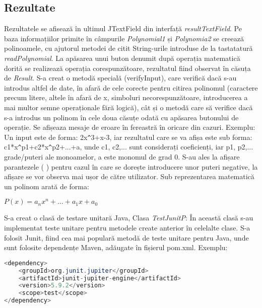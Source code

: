 \documentclass[a4paper,12pt]{article}
\begin{document}
\begin{enumerate}
\section{Rezultate}
Rezultatele se afisează în ultimul JTextField din interfață \emph{resultTextField}. Pe baza informațiilor primite în câmpurile \emph{Polynomial1} și \emph{Polynomia2} se creează polinoamele, cu ajutorul metodei de citit String-urile introduse de la tastatatură \emph{readPolynomial}. La apăsarea unui buton denumit după operația matematică dorită se realizează operația corespunzătoare, rezultatul fiind observat în căsuța de \emph{Result}. S-a creat o metodă specială (verifyInput), care verifică dacă s-au introdus altfel de date, în afară de cele corecte pentru citirea polinomul (caractere precum litere, altele în afară de x, simboluri necorespunzătoare, introducerea a mai multor semne operaționale fără logică), cât și o metodă care să verifice dacă s-a introdus un polinom în cele doua căsuțe odată cu apăsarea butonului de operație. Se afișeaza mesaje de eroare în fereastră în oricare din cazuri. 
Exemplu:
\newline
Un input este de forma:  2x\verb|^|3+x-3, iar rezultatul care se va afișa este sub forma: c1*x\verb|^|p1+c2*x\verb|^|p2+...+a, unde c1, c2,... sunt considerați coeficienți, iar p1, p2,... grade/puteri ale monoamelor, a este monomul de grad 0. S-au ales la afișare parantezele ( ) pentru cazul în care se dorește introducere unor puteri negative, la afișare se vor observa mai ușor de către utilizator. 
\newline
Sub reprezentarea matematică un polinom arată de forma: 
\newline
\begin{center}
$ P(x) = a_nx^n+\ldots+a_1x+a_0 $ 
\end{center}
\newline
S-a creat o clasă de testare unitară Java, Clasa \emph{TestJunitP}: În această clasă s-au implementat teste unitare pentru metodele create anterior în celelalte clase. S-a folosit Junit, fiind cea mai populară metodă de teste unitare pentru Java, unde sunt folosite dependențe Maven, adăugate în fișierul pom.xml. 
Exemplu:
\newline
\begin{lstlisting}[language = Java]
<dependency>
    <groupId>org.junit.jupiter</groupId>
    <artifactId>junit-jupiter-engine</artifactId>
    <version>5.9.2</version>
    <scope>test</scope>
</dependency>
\end{lstlisting}
\newline

\end{enumerate}
\end{document}
